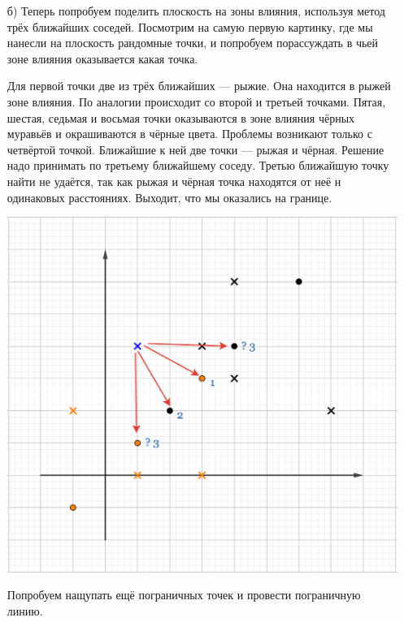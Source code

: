 \documentclass[12pt, a4paper, oneside]{article}
\theoremstyle{plain} %
\theoremstyle{definition}
\begin{document}
\begin{solution}
\begin{enumerate}
	\item[б)]  Теперь попробуем поделить плоскость на зоны влияния, используя метод трёх ближайших соседей. Посмотрим на самую первую картинку, где мы нанесли на плоскость рандомные точки, и попробуем порассуждать в чьей зоне влияния оказывается какая точка. 
	
	Для первой точки две из трёх ближайших --- рыжие. Она находится в рыжей зоне влияния. По аналогии происходит со второй и третьей точками.  Пятая, шестая, седьмая и восьмая точки оказываются в зоне влияния чёрных муравьёв и окрашиваются в чёрные цвета. Проблемы возникают только с четвёртой точкой. Ближайшие к ней две точки --- рыжая и чёрная. Решение надо принимать по третьему ближайшему соседу. Третью ближайшую точку найти не удаётся, так как рыжая и чёрная точка находятся от неё н одинаковых расстояниях. Выходит, что мы оказались на границе.
	
	\begin{center}
	    \includegraphics[scale=0.18]{2knn_4.png}
	\end{center} 

	Попробуем нащупать ещё пограничных точек и провести пограничную линию. 


\end{enumerate}
\end{solution}
\end{document}
